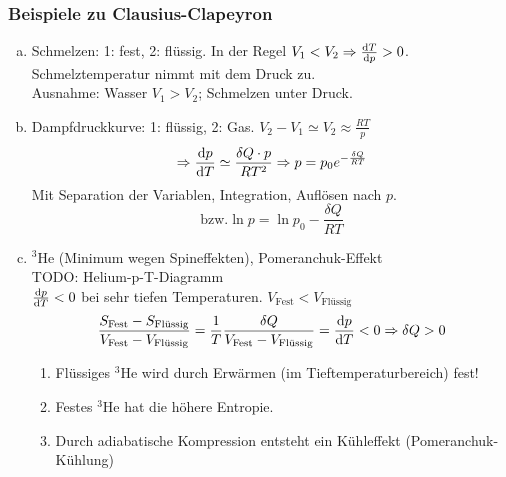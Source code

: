 \subsubsection{Beispiele zu Clausius-Clapeyron}
\begin{enumerate}[a)]
    \item Schmelzen: 1: fest, 2: flüssig. In der Regel $V_1 < V_2 \Rightarrow \frac{\mathrm{d} T}{\mathrm{d} p} > 0$. Schmelztemperatur nimmt mit dem Druck
    zu. \\
    Ausnahme: Wasser $V_1 > V_2$; Schmelzen unter Druck.
    \item Dampfdruckkurve: 1: flüssig, 2: Gas. $V_2 - V_1 \simeq V_2 \approx \frac{R T}{p}$
    \begin{equation}
        \Rightarrow \frac{\mathrm{d} p}{\mathrm{d} T} \simeq \frac{\delta Q \cdot p}{R T^2} \Rightarrow p = p_0 e^{- \frac{\delta Q}{R T}}
    \end{equation}
    Mit Separation der Variablen, Integration, Auflösen nach $p$.
    \begin{equation}
        \text{bzw.} \ln p = \ln p_0 - \frac{\delta Q}{R T}
    \end{equation}
    \item ${}^3\text{He}$ (Minimum wegen Spineffekten), Pomeranchuk-Effekt \\
    TODO: Helium-p-T-Diagramm \\ %
    $\frac{\mathrm{d} p}{\mathrm{d} T} < 0$ bei sehr tiefen Temperaturen. $V_\text{Fest} < V_\text{Flüssig}$
    \begin{equation}
        \frac{S_\text{Fest} - S_\text{Flüssig}}{V_\text{Fest} - V_\text{Flüssig}} = \frac{1}{T} \frac{\delta Q}{V_\text{Fest} - V_\text{Flüssig}} =
        \frac{\mathrm{d} p}{\mathrm{d} T} < 0 \Rightarrow \delta Q > 0
    \end{equation}
    \begin{enumerate}[1.]
        \item Flüssiges ${}^3\text{He}$ wird durch Erwärmen (im Tieftemperaturbereich) fest!
        \item Festes ${}^3\text{He}$ hat die höhere Entropie.
        \item Durch adiabatische Kompression entsteht ein Kühleffekt (Pomeranchuk-Kühlung)
    \end{enumerate}
\end{enumerate}

